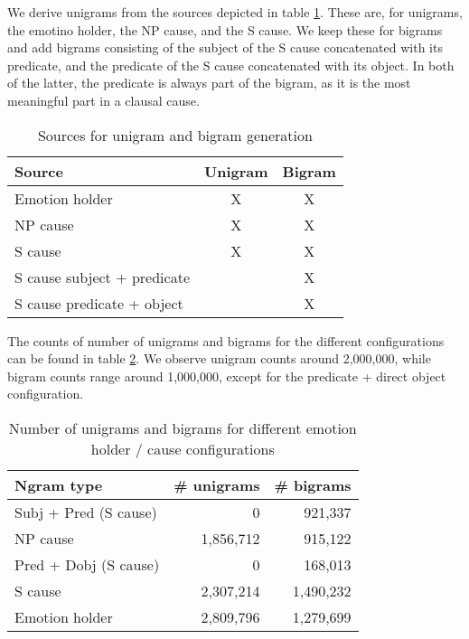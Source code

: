 We derive unigrams from the sources depicted in table \ref{tab:unigram-bigram-sources}. These are, for unigrams, the emotino holder, the NP cause, and the S cause. We keep these for bigrams and add bigrams consisting of the subject of the S cause concatenated with its predicate, and the predicate of the S cause concatenated with its object. In both of the latter, the predicate is always part of the bigram, as it is the most meaningful part in a clausal cause.

\begin{table}[]
\centering
\begin{tabular}{l|c|c}
{\bf Source} & {\bf Unigram} & {\bf Bigram} \\\hline
Emotion holder & \textsc{X} & \textsc{X} \\
NP cause & \textsc{X} & \textsc{X} \\
S cause & \textsc{X} & \textsc{X} \\
S cause subject + predicate &  & \textsc{X} \\
S cause predicate + object &  & \textsc{X}
\end{tabular}
\caption{Sources for unigram and bigram generation}
\label{tab:unigram-bigram-sources}
\end{table}

The counts of number of unigrams and bigrams for the different configurations can be found in table \ref{tab:unigram_bigram_count_ngram_type}. We observe unigram counts around 2,000,000, while bigram counts range around 1,000,000, except for the predicate + direct object configuration.

\begin{table}[h]
\centering
\begin{tabular}{l|r|r}
{\bf Ngram type}      & {\bf \# unigrams} & {\bf \# bigrams} \\\hline
Subj + Pred (S cause) & 0                 & 921,337          \\
NP cause              & 1,856,712         & 915,122          \\
Pred + Dobj (S cause) & 0                 & 168,013          \\
S cause               & 2,307,214         & 1,490,232        \\
Emotion holder        & 2,809,796         & 1,279,699       
\end{tabular}
\caption{Number of unigrams and bigrams for different emotion holder / cause configurations}
\label{tab:unigram_bigram_count_ngram_type}
\end{table}

